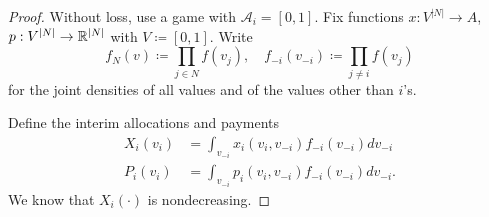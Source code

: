 \begin{proof}
	Without loss, use a game with $\mathscr{A}_i = \left[ 0,1 \right]$. Fix functions $x: V^{\left| N \right|} \to A$, $p: V^{\left| N \right|} \to \mathbb{R}^{\left| N \right|}$ with $V \coloneqq [0,1]$. Write
	\[
		f_N(v) \coloneqq \prod_{j \in N} f(v_j), \quad
		f_{-i}(v_{-i}) \coloneqq \prod_{j \ne i} f(v_j)
	\]
	for the joint densities of all values and of the values other than $i$'s.

	Define the interim allocations and payments
	\begin{align*}
		X_i(v_i) 
		&= \int_{v_{-i}}^{} x_i\left( v_i, v_{-i} \right)f_{-i}(v_{-i}) dv_{-i} \\
		P_i(v_i)
		&= \int_{v_{-i}}^{} p_i(v_i,v_{-i}) f_{-i}(v_{-i}) dv_{-i}
	.\end{align*}
	We know that $X_i(\cdot)$ is nondecreasing. 


\end{proof}
